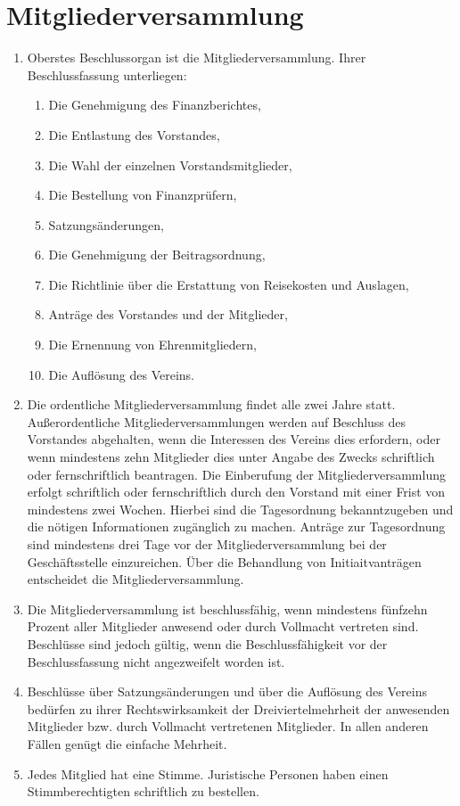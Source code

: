 \documentclass[a4paper, 12pt]{scrartcl}
\begin{document}
\section{Mitgliederversammlung}
     \begin{enumerate}
	  \item Oberstes Beschlussorgan ist die Mitgliederversammlung. Ihrer Beschlussfassung unterliegen:
	       \begin{enumerate}
		    \item Die Genehmigung des Finanzberichtes,
		    \item Die Entlastung des Vorstandes,
		    \item Die Wahl der einzelnen Vorstandsmitglieder,
		    \item Die Bestellung von Finanzprüfern,
		    \item Satzungsänderungen,
		    \item Die Genehmigung der Beitragsordnung,
		    \item Die Richtlinie über die Erstattung von Reisekosten und Auslagen, 
		    \item Anträge des Vorstandes und der Mitglieder,
		    \item Die Ernennung von Ehrenmitgliedern,
		    \item Die Auflösung des Vereins.
	       \end{enumerate}
	  \item Die ordentliche Mitgliederversammlung findet alle zwei Jahre statt. Außerordentliche Mitgliederversammlungen werden auf Beschluss des Vorstandes abgehalten, wenn die Interessen des Vereins dies erfordern, oder wenn mindestens zehn Mitglieder dies unter Angabe des Zwecks schriftlich oder fernschriftlich beantragen. Die Einberufung der Mitgliederversammlung erfolgt schriftlich oder fernschriftlich durch den Vorstand mit einer Frist von mindestens zwei Wochen. Hierbei sind die Tagesordnung bekanntzugeben und die nötigen Informationen zugänglich zu machen. Anträge zur Tagesordnung sind mindestens drei Tage vor der Mitgliederversammlung bei der Geschäftsstelle einzureichen. Über die Behandlung von Initiaitvanträgen entscheidet die Mitgliederversammlung.

	  \item Die Mitgliederversammlung ist beschlussfähig, wenn mindestens fünfzehn Prozent aller Mitglieder anwesend oder durch Vollmacht vertreten sind. Beschlüsse sind jedoch gültig, wenn die Beschlussfähigkeit vor der Beschlussfassung nicht angezweifelt worden ist.
	  \item  Beschlüsse über Satzungsänderungen und über die Auflösung des Vereins bedürfen zu ihrer Rechtswirksamkeit der Dreiviertelmehrheit der anwesenden Mitglieder bzw. durch Vollmacht vertretenen Mitglieder. In allen anderen Fällen genügt die einfache Mehrheit.
	  \item Jedes Mitglied hat eine Stimme. Juristische Personen haben einen Stimmberechtigten schriftlich zu bestellen.


\end{enumerate}
\end{document}
